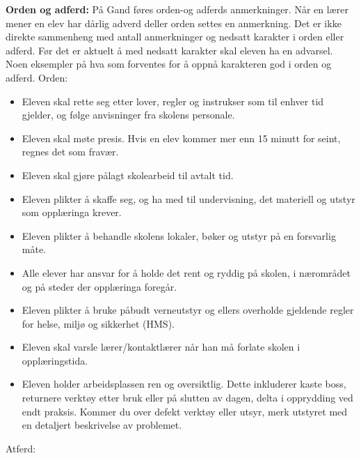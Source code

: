 \noindent
{\bf Orden og adferd:} På Gand føres orden-og adferds anmerkninger. Når en lærer mener en elev har dårlig adverd deller orden settes en anmerkning. Det er ikke direkte sammenheng med antall anmerkninger og nedsatt karakter i orden eller adferd. Før det er aktuelt å med nedsatt karakter skal eleven ha en advarsel. 
\vskip 10pt
Noen eksempler på hva som forventes for å oppnå karakteren god i orden og adferd. 
\vskip 10pt
Orden:
\begin{itemize}
\vskip 10pt
\item{}Eleven skal rette seg etter lover, regler og instrukser som til enhver tid gjelder, og følge anvisninger fra skolens personale.
\item{}Eleven skal møte presis. Hvis en elev kommer mer enn 15 minutt for seint, regnes det som fravær.
\item{}Eleven skal gjøre pålagt skolearbeid til avtalt tid.
\item{}Eleven plikter å skaffe seg, og ha med til undervisning, det materiell og utstyr som opplæringa krever.
\item{}Eleven plikter å behandle skolens lokaler, bøker og utstyr på en forsvarlig måte.
\item{}Alle elever har ansvar for å holde det rent og ryddig på skolen, i nærområdet og på steder der opplæringa foregår.
\item{}Eleven plikter å bruke påbudt verneutstyr og ellers overholde gjeldende regler for helse, miljø og sikkerhet (HMS).
\item{}Eleven skal varsle lærer/kontaktlærer når han må forlate skolen i opplæringstida.

\item{} Eleven holder arbeidsplassen ren og oversiktlig. Dette inkluderer kaste boss, returnere verktøy etter bruk eller på slutten av dagen, delta i opprydding ved endt praksis. Kommer du over defekt verktøy eller utsyr, merk utstyret med en detaljert beskrivelse av problemet. 
\vskip 10pt
\end{itemize}
Atferd:
\vskip 10pt
